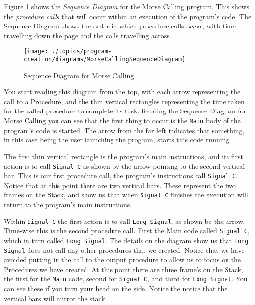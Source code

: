 Figure \ref{fig:procedure-decl-morsecalling-sequence} shows the \emph{Sequence Diagram} for the Morse Calling program. This shows the \emph{procedure calls} that will occur within an execution of the program's code. The Sequence Diagram shows the order in which procedure calls occur, with time travelling down the page and the calls travelling across. 

\begin{figure}[htbp]
   \centering
   \texttt{[image: ./topics/program-creation/diagrams/MorseCallingSequenceDiagram]} 
   \caption{Sequence Diagram for Morse Calling}
   \label{fig:procedure-decl-morsecalling-sequence}
\end{figure}

You start reading this diagram from the top, with each arrow representing the call to a Procedure, and the thin vertical rectangles representing the time taken for the called procedure to complete its task. Reading the Sequence Diagram for Morse Calling you can see that the first thing to occur is the \texttt{Main} body of the program's code is started. The arrow from the far left indicates that something, in this case being the user launching the program, starts this code running.

The first thin vertical rectangle is the program's main instructions, and its first action is to call \texttt{Signal C} as shown by the arrow pointing to the second vertical bar. This is our first procedure call, the program's instructions call \texttt{Signal C}. Notice that at this point there are two vertical bars. These represent the two frames on the Stack, and show us that when \texttt{Signal C} finishes the execution will return to the program's main instructions.

Within \texttt{Signal C} the first action is to call \texttt{Long Signal}, as shown be the arrow. Time-wise this is the second procedure call. First the Main code called \texttt{Signal C}, which in turn called \texttt{Long Signal}. The details on the diagram show us that \texttt{Long Signal} does not call any other procedures that we created. Notice that we have avoided putting in the call to the output procedure to allow us to focus on the Procedures we have created. At this point there are three frame's on the Stack, the first for the \texttt{Main} code, second for \texttt{Signal C}, and third for \texttt{Long Signal}. You can see these if you turn your head on the side. Notice the notice that the vertical bars will mirror the stack.

